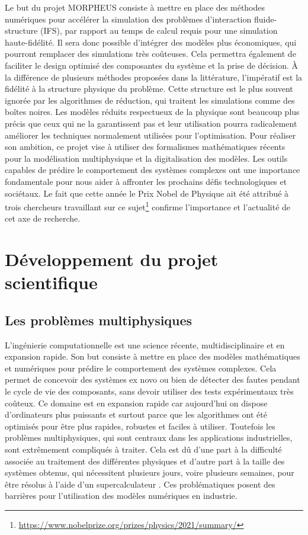 \documentclass[12pt, french]{article}
\begin{document}
	Le but du projet MORPHEUS consiste à mettre en place des méthodes numériques
	pour accélérer la simulation des problèmes d'interaction fluide-structure (IFS), par rapport au temps de calcul requis pour une simulation haute-fidélité. Il sera donc possible d'intégrer des modèles plus économiques, qui pourront remplacer des simulations très coûteuses. Cela permettra également de faciliter le design optimisé des composantes du système et la prise de décision. À la différence de plusieurs méthodes proposées dans la littérature, l'impératif est la fidélité à la structure physique du problème.  Cette structure est le plus souvent ignorée par les algorithmes de réduction, qui traitent les simulations comme des boîtes noires. Les modèles réduits respectueux de la physique sont beaucoup plus précis que ceux qui ne la garantissent pas et leur utilisation pourra radicalement améliorer les techniques normalement utilisées pour l'optimisation. Pour réaliser son ambition, ce projet vise à utiliser des formalismes mathématiques récents pour la modélisation multiphysique et la digitalisation des modèles. Les outils capables de prédire le comportement des systèmes complexes ont une importance fondamentale pour nous aider à affronter les prochains défis technologiques et sociétaux. Le fait que cette année le Prix Nobel de Physique ait été attribué à trois chercheurs travaillant sur ce sujet\footnote{\url{https://www.nobelprize.org/prizes/physics/2021/summary/}} confirme
	l'importance et l'actualité de cet axe de recherche.
	
	
	\section{Développement du projet scientifique}
	
	\subsection{Les problèmes multiphysiques}
	L'ingénierie computationnelle est une science récente, multidisciplinaire et en expansion rapide. Son but consiste à mettre en place des modèles mathématiques et numériques pour prédire le comportement des systèmes complexes. Cela permet de concevoir des systèmes ex novo ou bien de détecter des fautes pendant le cycle de vie des composants, sans devoir utiliser des tests expérimentaux très co\^{u}teux. Ce domaine est en expansion rapide car aujourd'hui on dispose d'ordinateurs plus puissants et surtout parce que les algorithmes ont été optimisés pour être plus rapides, robustes et faciles à utiliser. Toutefois les problèmes multiphysiques, qui sont centraux dans les applications industrielles, sont extrêmement compliqués à traiter.
	\newline
	\newline
	 Cela est d\^u d'une part à la difficulté associée au traitement des différentes physiques et d'autre part à la taille des systèmes obtenus, qui nécessitent plusieurs jours, voire plusieurs semaines, pour être résolus à l'aide d'un supercalculateur \cite{keyes2013}. Ces problématiques posent des barrières pour l'utilisation des modèles numériques en industrie. 
	
\end{document}
